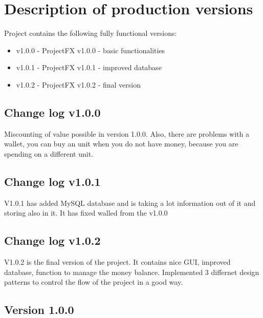 \documentclass[
]{report}
\providecommand{\tightlist}{%
  \setlength{\itemsep}{0pt}\setlength{\parskip}{0pt}}
\begin{document}
\hypertarget{description-of-production-versions}{%
\chapter{Description of production versions}\label{description-of-production-versions}}

Project contains the following fully functional versions:

\begin{itemize}
\tightlist
\item
  v1.0.0 - ProjectFX v1.0.0 - basic functionalities
\item
  v1.0.1 - ProjectFX v1.0.1 - improved database
\item
  v1.0.2 - ProjectFX v1.0.2 - final version
\end{itemize}

\hypertarget{change-log-v1.0.0}{%
\section{Change log v1.0.0}\label{change-log-v1.0.0}}

Miscounting of value possible in version 1.0.0. Also, there are problems with a wallet, you can buy an unit when you do not have money, because you are spending on a different unit.

\hypertarget{change-log-v1.0.1}{%
\section{Change log v1.0.1}\label{change-log-v1.0.1}}

V1.0.1 has added MySQL database and is taking a lot information out of it and storing also in it. It has fixed walled from the v1.0.0

\hypertarget{change-log-v1.0.2}{%
\section{Change log v1.0.2}\label{change-log-v1.0.2}}

V1.0.2 is the final version of the project. It contains nice GUI, improved database, function to manage the money balance. Implemented 3 differnet design patterns to control the flow of the project in a good way.

\hypertarget{version-1.0.0}{%
\section{Version 1.0.0}\label{version-1.0.0}}
\end{document}
